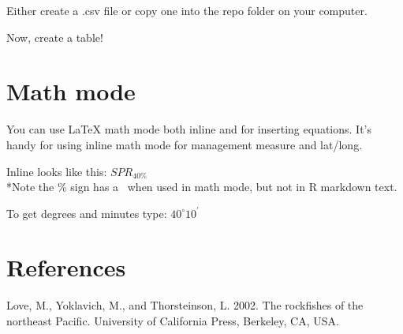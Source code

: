 \documentclass[12pt,]{article}
\begin{document}
Either create a .csv file or copy one into the repo folder on your
computer.

Now, create a table!

\section{Math mode}\label{math-mode}

You can use LaTeX math mode both inline and for inserting equations.
It's handy for using inline math mode for management measure and
lat/long.

Inline looks like this: \(SPR_{40\%}\)\\*Note the \% sign has a ~when
used in math mode, but not in R markdown text.

To get degrees and minutes type: \(40^\circ 10^\prime\)

\section*{References}\label{references}

Love, M., Yoklavich, M., and Thorsteinson, L. 2002. The rockfishes of
the northeast Pacific. University of California Press, Berkeley, CA,
USA.
\end{document}
